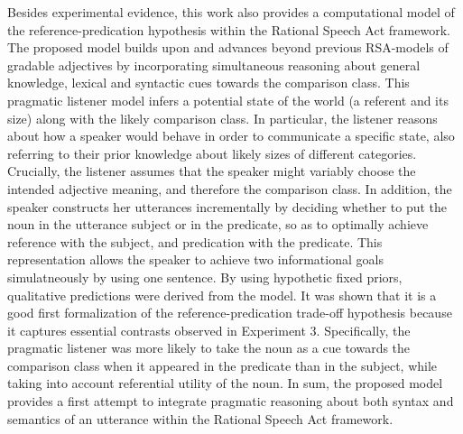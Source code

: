 Besides experimental evidence, this work also provides a computational model of the reference-predication hypothesis within the Rational Speech Act framework. The proposed model builds upon and advances beyond previous RSA-models of gradable adjectives by incorporating simultaneous reasoning about general knowledge, lexical and syntactic cues towards the comparison class. This pragmatic listener model infers a potential state of the world (a referent and its size) along with the likely comparison class. In particular, the listener reasons about how a speaker would behave in order to communicate a specific state, also referring to their prior knowledge about likely sizes of different categories. Crucially, the listener assumes that the speaker might variably choose the intended adjective meaning, and therefore the comparison class. 
In addition, the speaker constructs her utterances incrementally by deciding whether to put the noun in the utterance subject or in the predicate, so as to optimally achieve reference with the subject, and predication with the predicate. This representation allows the speaker to achieve two informational goals simulatneously by using one sentence. By using hypothetic fixed priors, qualitative predictions were derived from the model. It was shown that it is a good first formalization of the reference-predication trade-off hypothesis because it captures essential contrasts observed in Experiment 3. Specifically, the pragmatic listener was more likely to take the noun as a cue towards the comparison class when it appeared in the predicate than in the subject, while taking into account referential utility of the noun. In sum, the proposed model provides a first attempt to integrate pragmatic reasoning about both syntax and semantics of an utterance within the Rational Speech Act framework. 

